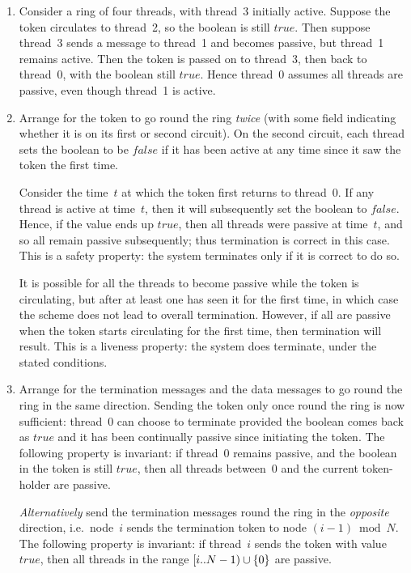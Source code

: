 
\begin{answerI}
\begin{enumerate}
\item
Consider a ring of four threads, with thread~3 initially active.  Suppose
the token circulates to thread~2, so the boolean is still $true$.  Then
suppose thread~3 sends a message to thread~1 and becomes passive, but
thread~1 remains active.  Then the token is passed on to thread~3, then
back to thread~0, with the boolean still $true$.  Hence thread~0 assumes all
threads are passive, even though thread~1 is active.


\item Arrange for the token to go round the ring \emph{twice} (with some field
indicating whether it is on its first or second circuit).  On the second
circuit, each thread sets the boolean to be $false$ if it has been active at
any time since it saw the token the first time.

Consider the time~$t$ at which the token first returns to thread~0.  If any
thread is active at time~$t$, then it will subsequently set the boolean to
$false$.  Hence, if the value ends up $true$, then all threads were passive at
time~$t$, and so all remain passive subsequently; thus termination is correct
in this case.  This is a safety property: the system terminates only if it is
correct to do so.

It is possible for all the threads to become passive while the token is
circulating, but after at least one has seen it for the first time, in which
case the scheme does not lead to overall termination.  However, if
all are passive when the token starts circulating for the first time, then
termination will result.  This is a liveness property: the system does
terminate, under the stated conditions.


\item Arrange for the termination messages and the data messages to go round
the ring in the same direction.  Sending the token only once round the ring is
now sufficient: thread~0 can choose to terminate provided the boolean comes
back as $true$ and it has been continually passive since initiating the token.
The following property is invariant: if thread~0 remains passive, and the
boolean in the token is still $true$, then all threads between~0 and the
current token-holder are passive.

\emph{Alternatively} send the termination messages round the ring in the
\emph{opposite} direction, i.e.~node~$i$ sends the termination token to
node ${(i-1)} \bmod N$.   The following property is invariant: if thread~$i$
sends the token with value $true$, then all threads in the range $[i ..
N-1) \cup \{0\}$ are passive.
\end{enumerate}
\end{answerI}
